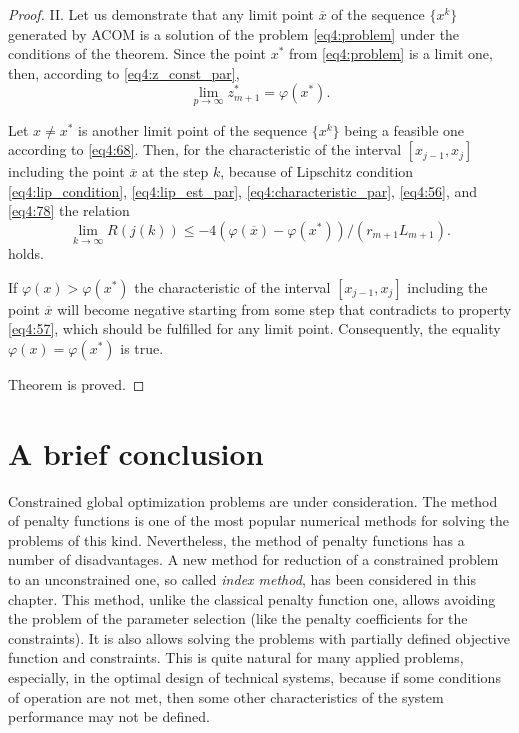 \begin{proof}
  II. Let us demonstrate that any limit point $\overline x$ of the sequence $\{x^k\}$ generated by ACOM is a solution of the problem \eqref{eq4:problem} under the conditions of the theorem. Since the point $x^*$ from \eqref{eq4:problem} is a limit one, then, according to \eqref{eq4:z_const_par},
  \begin{equation}
    \label{eq4:78}
    \lim_{p\to\infty}z^*_{m+1}=\varphi(x^*).
  \end{equation}

  Let $x\not=x^*$ is another limit point of the sequence $\{x^k\}$ being a feasible one according to \eqref{eq4:68}. Then, for the characteristic of the interval $[x_{j-1},x_j]$ including the point $\overline x$ at the step $k$, because of Lipschitz condition \eqref{eq4:lip_condition}, \eqref{eq4:lip_est_par}, \eqref{eq4:characteristic_par}, \eqref{eq4:56}, and \eqref{eq4:78} the relation
  \begin{displaymath}
    \lim_{k\to\infty}R(j(k))\le-4(\varphi(\overline x)-\varphi(x^*))/(r_{m+1}L_{m+1}).
  \end{displaymath}
  holds.

  If $\varphi(x)>\varphi(x^*)$ the characteristic of the interval $[x_{j-1},x_j]$ including the point $\overline x$ will become negative starting from some step that contradicts to property \eqref{eq4:57}, which should be fulfilled for any limit point. Consequently, the equality $\varphi(x)=\varphi(x^*)$  is true.

  Theorem is proved.
\end{proof}

\section*{A brief conclusion}
Constrained global optimization problems are under consideration. The method of penalty functions is one of the most popular numerical methods for solving the problems of this kind. Nevertheless, the method of penalty functions has a number of disadvantages. A new method for reduction of a constrained problem to an unconstrained one, so called \emph{index method}, has been considered in this chapter. This method, unlike the classical penalty function one, allows avoiding the problem of the parameter selection (like the penalty coefficients for the constraints). It is also allows solving the problems with partially defined objective function and constraints. This is quite natural for many applied problems, especially, in the optimal design of technical systems, because if some conditions of operation are not met, then some other characteristics of the system performance may not be defined.

